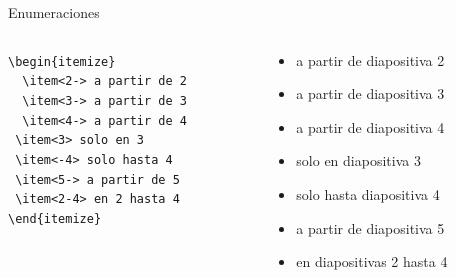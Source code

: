 \documentclass[dvipsnames,xcolor=x11names]{beamer}
\theoremstyle{plain}
\theoremstyle{definition}
\begin{document}
\begin{frame}[fragile]{Enumeraciones}
   \begin{columns}
      \begin{column}{.5\textwidth}
	 \verb+\begin{itemize}+\\
	 \verb+  \item<2-> a partir de 2+\\
	 \verb+  \item<3-> a partir de 3+\\
	 \verb+  \item<4-> a partir de 4+\\
	 \verb+ \item<3> solo en 3+\\
	 \verb+ \item<-4> solo hasta 4+\\
	 \verb+ \item<5-> a partir de 5+\\
	 \verb+ \item<2-4> en 2 hasta 4+\\
	 \verb+\end{itemize}+
      \end{column}
      \begin{column}{.5\textwidth}
      \begin{itemize}
	 \item<2-> a partir de diapositiva 2
	 \item<3-> a partir de diapositiva 3
	 \item<4-> a partir de diapositiva 4
	 \item<3> solo en diapositiva 3
	 \item<-4> solo hasta diapositiva 4
	 \item<5-> a partir de diapositiva 5
	 \item<2-4> en diapositivas 2 hasta 4
      \end{itemize}
      \end{column}
   \end{columns}
   \bigskip

   \centerline{\bf\color{red}
   }
\end{frame}
\end{document}
